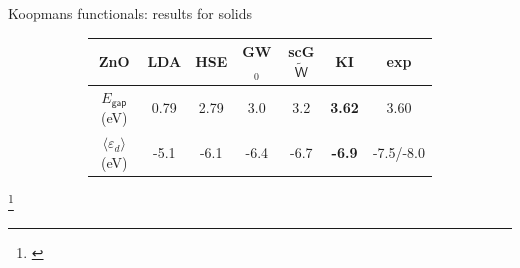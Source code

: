 \documentclass[xcolor=table,aspectratio=169]{beamer}
\newcommand\blfootcite[1]{%
  \begingroup
  \renewcommand\thefootnote{}\footnote{\hspace{-4ex}\cite{#1}}%
  \addtocounter{footnote}{-1}%
  \endgroup
}
\numberwithin{equation}{section}
\begin{document}
\begin{frame}{Koopmans functionals: results for solids}
\begin{figure}[t]
\begin{subfigure}{0.3\textwidth}
      \end{subfigure}
      \begin{subfigure}{\textwidth} %
         \centering
         \begin{tabular}{c S[table-format = 2.2] S[table-format = 2.2] S[table-format = 2.2] S[table-format = 2.2] >{\color{seaborn_red}\bfseries}S[table-format = 2.2] S[table-format = 2.2]}
            ZnO                                  & {LDA} & {HSE} & {GW$_0$} & {scG$\tilde{\mathsf{W}}$} & {KI} & {exp}       \\
            \hline
            $E_\mathsf{gap}$ (eV)                & 0.79  & 2.79  & 3.0      & 3.2                  & 3.62 & 3.60        \\
            $\langle \varepsilon_d \rangle$ (eV) & -5.1  & -6.1  & -6.4     & -6.7                 & -6.9 & {-7.5/-8.0} \\
         \end{tabular}
      \end{subfigure}
   \end{figure}
   \blfootcite{Colonna2022}
\end{frame}
\end{document}
